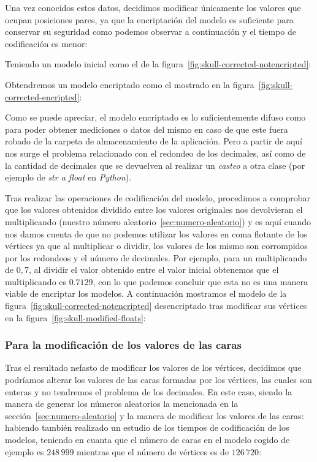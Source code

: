 Una vez conocidos estos datos, decidimos modificar únicamente los valores que ocupan posiciones pares, ya que la encriptación del modelo es suficiente para conservar su seguridad como podemos observar a continuación y el tiempo de codificación es menor:

Teniendo un modelo inicial como el de la figura~\ref{fig:skull-corrected-notencripted}:

Obtendremos un modelo encriptado como el mostrado en la figura~\ref{fig:skull-corrected-encripted}:

Como se puede apreciar, el modelo encriptado es lo suficientemente difuso como para poder obtener mediciones o datos del mismo en caso de que este fuera robado de la carpeta de almacenamiento de la aplicación. Pero a partir de aquí nos surge el problema relacionado con el redondeo de los decimales, así como de la cantidad de decimales que se devuelven al realizar un \textit{casteo} a otra clase (por ejemplo de \textit{str a float} en \textit{Python}).

Tras realizar las operaciones de codificación del modelo, procedimos a comprobar que los valores obtenidos dividido entre los valores originales nos devolvieran el multiplicando (nuestro número aleatorio~\ref{sec:numero-aleatorio}) y es aquí cuando nos damos cuenta de que no podemos utilizar los valores en coma flotante de los vértices ya que al multiplicar o dividir, los valores de los mismo son corrompidos por los redondeos y el número de decimales. Por ejemplo, para un multiplicando de $0,7$, al dividir el valor obtenido entre el valor inicial obtenemos que el multiplicando es $0.7129$, con lo que podemos concluir que esta no es una manera viable de encriptar los modelos. A continuación mostramos el modelo de la figura~\ref{fig:skull-corrected-notencripted} desencriptado tras modificar sus vértices en la figura~\ref{fig:skull-modified-floats}:

\subsubsection{Para la modificación de los valores de las caras}
Tras el resultado nefasto de modificar los valores de los vértices, decidimos que podríamos alterar los valores de las caras formadas por los vértices, las cuales son enteras y no tendremos el problema de los decimales. En este caso, siendo la manera de generar los números aleatorios la mencionada en la sección~\ref{sec:numero-aleatorio} y la manera de modificar los valores de las caras:  habiendo también realizado un estudio de los tiempos de codificación de los modelos, teniendo en cuanta que el número de caras en el modelo cogido de ejemplo es $248\,999$ mientras que el número de vértices es de $126\,720$:

